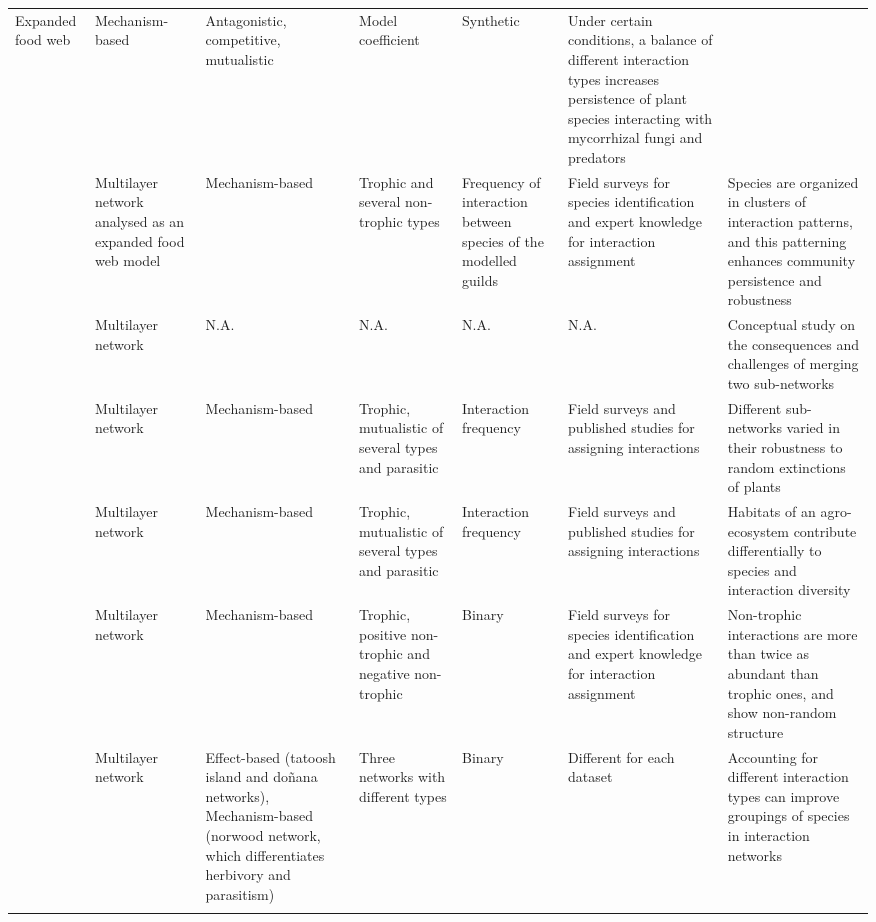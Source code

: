 {\begin{landscape}
\begin{footnotesize}
\begin{longtable}{p{1.5cm}p{1.5cm}p{2cm}p{2cm}p{2cm}p{2cm}p{4cm}}
Expanded food web &
Mechanism-based &
Antagonistic, competitive, mutualistic &
Model coefficient &
Synthetic &
Under certain conditions, a balance of different interaction types increases persistence of plant species interacting with mycorrhizal fungi and predators\\%
\citealt{Kefi2016a} & %
Multilayer network analysed as an expanded food web model &
Mechanism-based &
Trophic and several non-trophic types &
Frequency of interaction between species of the modelled guilds &
Field surveys for species identification and expert knowledge for interaction assignment &
Species are organized in clusters of interaction patterns, and this patterning enhances community persistence and robustness\\%
\citealt{Fontaine2011} & %
Multilayer network &
N.A. &
N.A. &
N.A. &
N.A. &
Conceptual study on the consequences and challenges of merging two sub-networks\\%
\citealt{Pocock2012} & %
Multilayer network &
Mechanism-based &
Trophic, mutualistic of several types and parasitic &
Interaction frequency &
Field surveys and published studies for assigning interactions &
Different sub-networks varied in their robustness to random extinctions of plants\\%
\citealt{Evans2013a} & %
Multilayer network &
Mechanism-based &
Trophic, mutualistic of several types and parasitic &
Interaction frequency &
Field surveys and published studies for assigning interactions &
Habitats of an agro-ecosystem contribute differentially to species and interaction diversity\\%
\citealt{Kefi2015} & %
Multilayer network &
Mechanism-based &
Trophic, positive non-trophic and negative non-trophic &
Binary &
Field surveys for species identification and expert knowledge for interaction assignment &
Non-trophic interactions are more than twice as abundant than trophic ones, and show non-random structure\\%
\citealt{Sander2015} & %
Multilayer network &
Effect-based (tatoosh island and doñana networks), Mechanism-based (norwood network, which differentiates herbivory and parasitism) &
Three networks with different types &
Binary &
Different for each dataset &
Accounting for different interaction types can improve groupings of species in interaction networks\\%
\citealt{Dattilo2016} & %

\end{longtable}
\end{footnotesize}
\end{landscape}}
